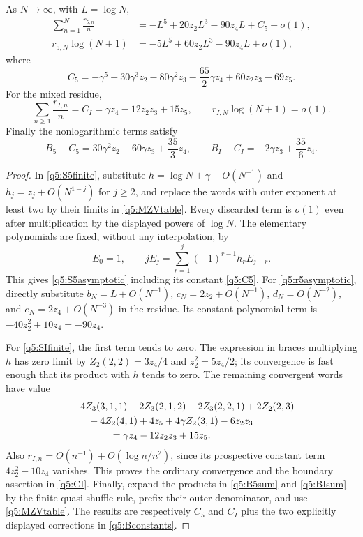 \begin{lemma}
\label{q5:constants}
As $N\to\infty$, with $L=\log N$,
\begin{align}
 \sum_{n=1}^N\frac{r_{5,n}}n
   &=-L^5+20z_2L^3-90z_4L+C_5+o(1),
   \label{q5:S5asymptotic}\\
 r_{5,N}\log(N+1)
   &=-5L^5+60z_2L^3-90z_4L+o(1),
   \label{q5:r5asymptotic}
\end{align}
where
\begin{equation}\label{q5:C5}
 C_5=-\gamma^5+30\gamma^3z_2-80\gamma^2z_3
         -\frac{65}{2}\gamma z_4+60z_2z_3-69z_5.
\end{equation}
For the mixed residue,
\begin{equation}\label{q5:CI}
 \sum_{n\geq1}\frac{r_{I,n}}n
      =C_I=\gamma z_4-12z_2z_3+15z_5,
 \qquad r_{I,N}\log(N+1)=o(1).
\end{equation}
Finally the nonlogarithmic terms satisfy
\begin{equation}\label{q5:Bconstants}
 B_5-C_5=30\gamma^2z_2-60\gamma z_3+\frac{35}{3}z_4,
 \qquad
 B_I-C_I=-2\gamma z_3+\frac{35}{6}z_4.
\end{equation}
\end{lemma}
\begin{proof}
In \eqref{q5:S5finite}, substitute
$h=\log N+\gamma+O(N^{-1})$ and
$h_j=z_j+O(N^{1-j})$ for $j\geq2$, and replace the words with
outer exponent at least two by their limits in
\eqref{q5:MZVtable}.  Every discarded term is $o(1)$ even after
multiplication by the displayed powers of $\log N$.
The elementary polynomials are fixed, without any interpolation, by
\[
 E_0=1,\qquad
 jE_j=\sum_{r=1}^j(-1)^{r-1}h_rE_{j-r}.
\]
This gives \eqref{q5:S5asymptotic} including its constant
\eqref{q5:C5}.  For \eqref{q5:r5asymptotic}, directly substitute
$b_N=L+O(N^{-1})$, $c_N=2z_2+O(N^{-1})$,
$d_N=O(N^{-2})$, and $e_N=2z_4+O(N^{-3})$ in the residue.
Its constant polynomial term is
$-40z_2^2+10z_4=-90z_4$.

For \eqref{q5:SIfinite}, the first term tends to zero.  The expression
in braces multiplying $h$ has zero limit by
$Z_2(2,2)=3z_4/4$ and $z_2^2=5z_4/2$; its convergence is fast
enough that its product with $h$ tends to zero.  The remaining convergent
words have value
\begin{align*}
 &-4Z_3(3,1,1)-2Z_3(2,1,2)-2Z_3(2,2,1)+2Z_2(2,3)\\
 &\qquad+4Z_2(4,1)+4z_5+4\gamma Z_2(3,1)-6z_2z_3\\
 &\hspace{15mm}=\gamma z_4-12z_2z_3+15z_5.
\end{align*}
Also $r_{I,n}=O(n^{-1})+O(\log n/n^2)$, since its prospective
constant term $4z_2^2-10z_4$ vanishes.  This proves the ordinary
convergence and the boundary assertion in \eqref{q5:CI}.
Finally, expand the products in \eqref{q5:B5sum} and
\eqref{q5:BIsum} by the finite quasi-shuffle rule, prefix their
outer denominator, and use \eqref{q5:MZVtable}.
The results are respectively $C_5$ and $C_I$ plus the two explicitly
displayed corrections in \eqref{q5:Bconstants}.
\end{proof}

